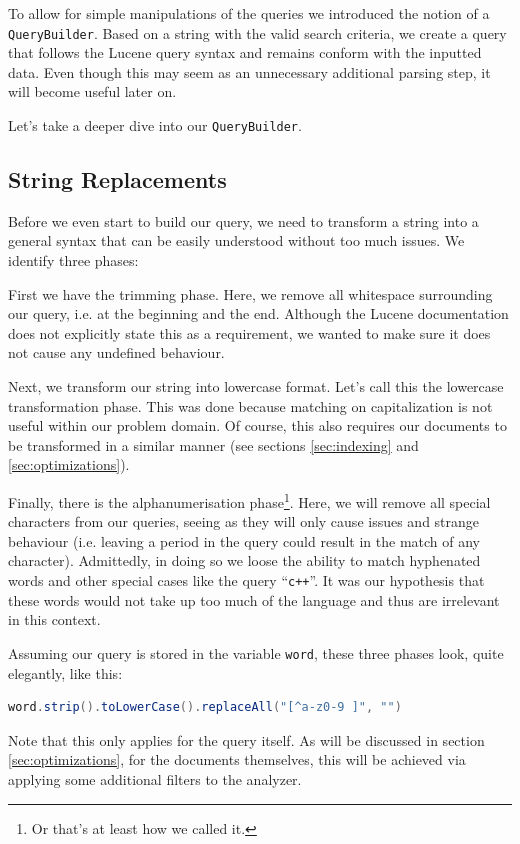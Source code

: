 \documentclass[11pt]{article}
\begin{document}
To allow for simple manipulations of the queries we introduced the notion of a \texttt{QueryBuilder}. Based on a string with the valid search criteria, we create a query that follows the Lucene query syntax and remains conform with the inputted data. Even though this may seem as an unnecessary additional parsing step, it will become useful later on.

Let's take a deeper dive into our \texttt{QueryBuilder}.

\subsection{String Replacements}
Before we even start to build our query, we need to transform a string into a general syntax that can be easily understood without too much issues. We identify three phases:

First we have the \textsf{trimming phase}. Here, we remove all whitespace surrounding our query, i.e. at the beginning and the end. Although the Lucene documentation does not explicitly state this as a requirement, we wanted to make sure it does not cause any undefined behaviour.

Next, we transform our string into lowercase format. Let's call this the \textsf{lowercase transformation phase}. This was done because matching on capitalization is not useful within our problem domain. Of course, this also requires our documents to be transformed in a similar manner (see sections \ref{sec:indexing} and \ref{sec:optimizations}).

Finally, there is the \textsf{alphanumerisation phase}\footnote{Or that's at least how we called it.}. Here, we will remove all special characters from our queries, seeing as they will only cause issues and strange behaviour (i.e. leaving a period in the query could result in the match of any character). Admittedly, in doing so we loose the ability to match hyphenated words and other special cases like the query ``\texttt{c++}''. It was our hypothesis that these words would not take up too much of the language and thus are irrelevant in this context.

Assuming our query is stored in the variable \texttt{word}, these three phases look, quite elegantly, like this:
\begin{lstlisting}[language=Java]
word.strip().toLowerCase().replaceAll("[^a-z0-9 ]", "")
\end{lstlisting}

Note that this only applies for the query itself. As will be discussed in section \ref{sec:optimizations}, for the documents themselves, this will be achieved via applying some additional filters to the analyzer.
\end{document}

